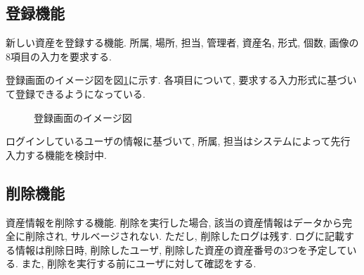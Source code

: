 \documentclass[11ptm]{jsarticle}
\begin{document}
\clearpage
\subsection{登録機能}
\label{subsec:登録機能}
新しい資産を登録する機能. 所属, 場所, 担当, 管理者, 資産名, 形式, 個数, 画像の8項目の入力を要求する. \par
登録画面のイメージ図を図\ref{fig:登録画面のイメージ図}に示す. 各項目について, 要求する入力形式に基づいて登録できるようになっている.
\begin{figure}[h]
  \centering
  \caption{\label{fig:登録画面のイメージ図}登録画面のイメージ図}
\end{figure}\par
ログインしているユーザの情報に基づいて, 所属, 担当はシステムによって先行入力する機能を検討中.

\subsection{削除機能}
\label{subsec:削除機能}
資産情報を削除する機能. 削除を実行した場合, 該当の資産情報はデータから完全に削除され, サルベージされない. ただし, 削除したログは残す. ログに記載する情報は削除日時, 削除したユーザ, 削除した資産の資産番号の3つを予定している. また, 削除を実行する前にユーザに対して確認をする.

\clearpage
\end{document}
